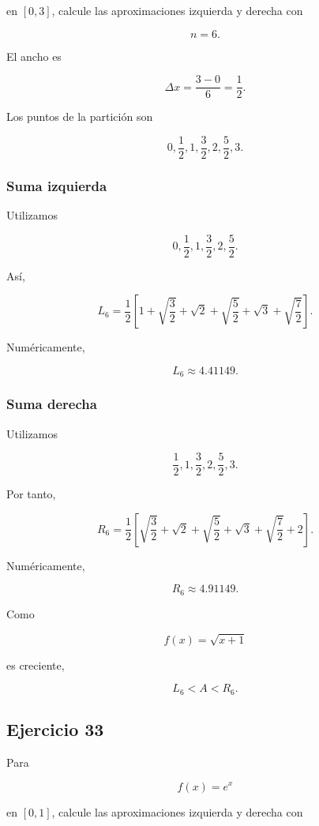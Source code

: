 \documentclass[12pt]{article}
\begin{document}
en \([0,3]\), calcule las aproximaciones izquierda y derecha con

\[
n=6.
\]

El ancho es

\[
\Delta x
=
\frac{3-0}{6}
=
\frac12.
\]

Los puntos de la partición son

\[
0,\frac12,1,\frac32,2,\frac52,3.
\]

\subsubsection*{Suma izquierda}

Utilizamos

\[
0,\frac12,1,\frac32,2,\frac52.
\]

Así,

\[
L_6
=
\frac12
\left[
1
+
\sqrt{\frac32}
+
\sqrt2
+
\sqrt{\frac52}
+
\sqrt3
+
\sqrt{\frac72}
\right].
\]

Numéricamente,

\[
\boxed{
L_6\approx4.41149
}.
\]

\subsubsection*{Suma derecha}

Utilizamos

\[
\frac12,1,\frac32,2,\frac52,3.
\]

Por tanto,

\[
R_6
=
\frac12
\left[
\sqrt{\frac32}
+
\sqrt2
+
\sqrt{\frac52}
+
\sqrt3
+
\sqrt{\frac72}
+
2
\right].
\]

Numéricamente,

\[
\boxed{
R_6\approx4.91149
}.
\]

Como

\[
f(x)=\sqrt{x+1}
\]

es creciente,

\[
\boxed{
L_6<A<R_6
}.
\]

\subsection*{Ejercicio 33}

Para

\[
f(x)=e^x
\]

en \([0,1]\), calcule las aproximaciones izquierda y derecha con
\end{document}
